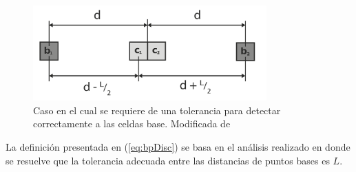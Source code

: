 \begin{figure}[H]
  \centerfloat

  \includegraphics[clip=true, width=0.80\textwidth]{imagenes/basis/horizontalMod.png}

  \caption[Caso en el cual se requiere de una tolerancia para detectar correctmente a las celdas base.]{Caso en el cual se requiere de una tolerancia para detectar correctamente a las celdas base. Modificada de \cite{Liu2015}}\label{fig:bptol}

\end{figure}

La definición presentada en (\ref{eq:bpDisc}) se basa en el análisis realizado
en \cite{Liu2015} donde se resuelve que la tolerancia adecuada entre las
distancias de puntos bases es $L$.



